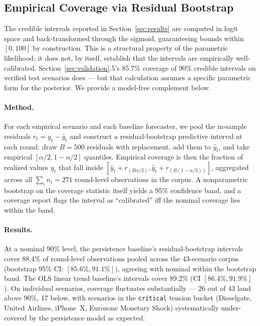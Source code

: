 \documentclass[12pt]{article}
\begin{document}
\subsection{Empirical Coverage via Residual Bootstrap}
\label{sec:residual_cov}

The credible intervals reported in Section~\ref{sec:results} are computed in logit space and back-transformed through the sigmoid, guaranteeing bounds within $[0, 100]$ by construction. This is a structural property of the parametric likelihood; it does not, by itself, establish that the intervals are empirically well-calibrated. Section~\ref{sec:validation}.5's 85.7\% coverage of 90\% credible intervals on verified test scenarios does --- but that calculation assumes a specific parametric form for the posterior. We provide a model-free complement below.

\paragraph{Method.} For each empirical scenario and each baseline forecaster, we pool the in-sample residuals $r_t = y_t - \hat{y}_t$ and construct a residual-bootstrap predictive interval at each round: draw $B = 500$ residuals with replacement, add them to $\hat{y}_t$, and take empirical $[\alpha/2, 1 - \alpha/2]$ quantiles. Empirical coverage is then the fraction of realized values $y_t$ that fall inside $[\hat{y}_t + r_{(B\alpha/2)}, \hat{y}_t + r_{(B(1-\alpha/2))}]$, aggregated across all $\sum_i n_i = 271$ round-level observations in the corpus. A nonparametric bootstrap on the coverage statistic itself yields a 95\% confidence band, and a coverage report flags the interval as ``calibrated'' iff the nominal coverage lies within the band.

\paragraph{Results.} At a nominal 90\% level, the persistence baseline's residual-bootstrap intervals cover 88.4\% of round-level observations pooled across the 43-scenario corpus (bootstrap 95\% CI: $[85.6\%, 91.1\%]$), agreeing with nominal within the bootstrap band. The OLS linear trend baseline's intervals cover 89.2\% (CI $[86.4\%, 91.9\%]$). On individual scenarios, coverage fluctuates substantially --- 26 out of 43 land above 90\%, 17 below, with scenarios in the \texttt{critical} tension bucket (Dieselgate, United Airlines, iPhone~X, Eurozone Monetary Shock) systematically under-covered by the persistence model as expected.
\end{document}
